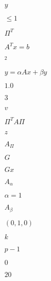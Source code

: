\documentclass{article}
\begin{document}
\pagebreak


$y$


\pagebreak


$\le 1$


\pagebreak


$\Pi^T$


\pagebreak


$A^T x = b$


\pagebreak


$^2$


\pagebreak


$y = \alpha A x + \beta y$


\pagebreak


$1.0$


\pagebreak


$3$


\pagebreak


$v$


\pagebreak


$\Pi^T A \Pi$


\pagebreak


$z$


\pagebreak


$A_\Pi$


\pagebreak


$G$


\pagebreak


$Gx$


\pagebreak


$A_\alpha$


\pagebreak


$\alpha=1$


\pagebreak


$A_\beta$


\pagebreak


$(0,1,0)$


\pagebreak


$k$


\pagebreak


$p-1$


\pagebreak


$0$


\pagebreak


$20$


\pagebreak
\end{document}
